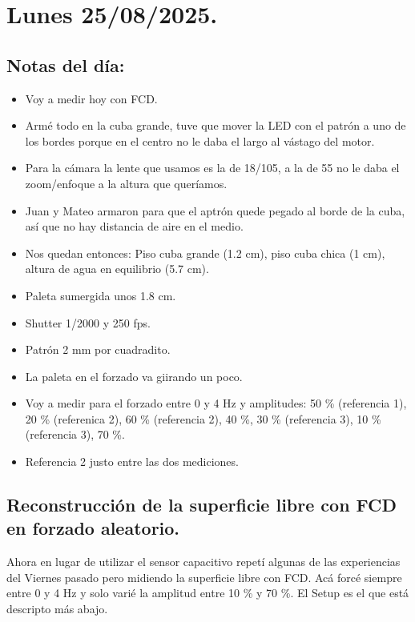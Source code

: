 
\section{Lunes 25/08/2025.}  

\subsection*{Notas del día:}  
\begin{itemize}
	\setlength\itemsep{0.1em}
	\item Voy a medir hoy con FCD. 
	\item Armé todo en la cuba grande, tuve que mover la LED con el patrón a uno de los bordes porque en el centro no le daba el largo al vástago del motor. 
	\item Para la cámara la lente que usamos es la de 18/105, a la de 55 no le daba el zoom/enfoque a la altura que queríamos. 
	\item Juan y Mateo armaron para que el aptrón quede pegado al borde de la cuba, así que no hay distancia de aire en el medio. 
	
	\item Nos quedan entonces: Piso cuba grande (1.2 cm), piso cuba chica (1 cm), altura de agua en equilibrio (5.7 cm). 
	\item Paleta sumergida unos 1.8 cm. 
	
	\item Shutter 1/2000 y 250 fps. 
	\item Patrón 2 mm por cuadradito. 
	\item La paleta en el forzado va giirando un poco. 
	
	\item Voy a medir para el forzado entre 0 y 4 Hz y amplitudes: 50 \% (referencia 1), 20 \% (referenica 2), 60 \% (referencia 2), 40 \%, 30 \% (referencia 3), 10 \% (referencia 3), 70 \%. 
	\item Referencia 2 justo entre las dos mediciones. 
	
\end{itemize}

\subsection*{Reconstrucción de la superficie libre con FCD en forzado aleatorio.}

Ahora en lugar de utilizar el sensor capacitivo repetí algunas de las experiencias del Viernes pasado pero midiendo la superficie libre con FCD. Acá forcé siempre entre 0 y 4 Hz y solo varié la amplitud entre 10 \% y 70 \%. El Setup es el que está descripto más abajo. 

